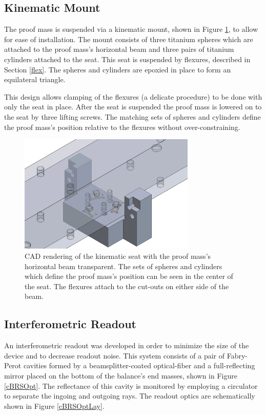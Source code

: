 \documentclass [12pt, proquest]{uwthesis}[2019]
\begin{document}
\subsection{Kinematic Mount}

The proof mass is suspended via a kinematic mount, shown in Figure \ref{kmount}, to allow for ease of installation. The mount consists of three titanium spheres which are attached to the proof mass's horizontal beam and three pairs of titanium cylinders attached to the seat. This seat is suspended by flexures, described in Section \ref{flex}. The spheres and cylinders are epoxied in place to form an equilateral triangle.

This design allows clamping of the flexures (a delicate procedure) to be done with only the seat in place. After the seat is suspended the proof mass is lowered on to the seat by three lifting screws. The matching sets of spheres and cylinders define the proof mass's position relative to the flexures without over-constraining.

\begin{figure}[!h]
\begin{center}
\includegraphics[width=0.75\textwidth]{cBRSKMount.png}
\end{center}
\caption[CAD rendering of the cBRS kinematic mount]{CAD rendering of the kinematic seat with the proof mass's horizontal beam transparent. The sets of spheres and cylinders which define the proof mass's position can be seen in the center of the seat. The flexures attach to the cut-outs on either side of the beam.}\label{kmount}
\end{figure}

\subsection{Interferometric Readout}
An interferometric readout was developed in order to minimize the size of the device and to decrease readout noise. This system consists of a pair of Fabry-Perot cavities formed by a beamsplitter-coated optical-fiber and a full-reflecting mirror placed on the bottom of the balance's end masses, shown in Figure \ref{cBRSOpt}. The reflectance of this cavity is monitored by employing a circulator to separate the ingoing and outgoing rays. The readout optics are schematically shown in Figure \ref{cBRSOptLay}. 
\end{document}
